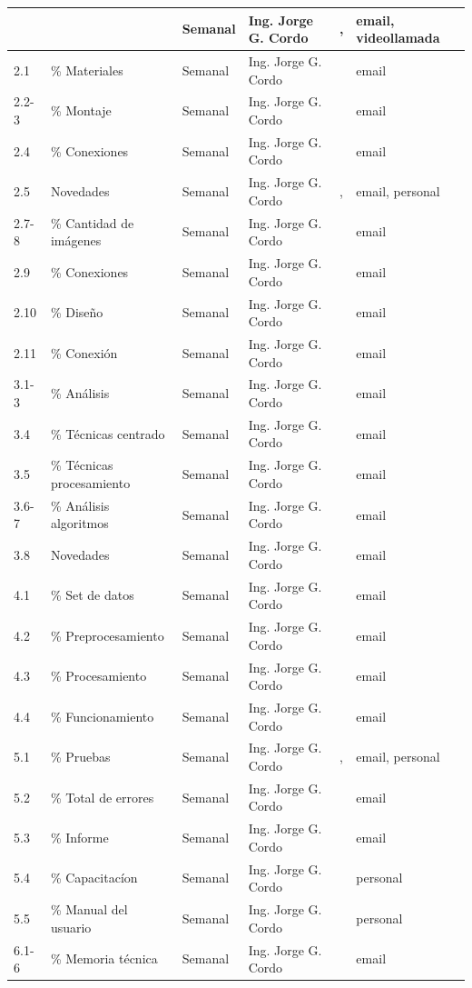 \documentclass[11pt]{charter}
\begin{document}
\begin{longtable}{|m{1cm}|m{3.5cm}|m{2.2cm}|m{2cm}|m{3cm}|m{1.5cm}|}
\endlastfoot
1	 	& \fechaInicioName  		&Semanal  	&Ing. Jorge G. Cordo 	&\supname, \clientename  	&email, videollamada \\ \hline
2.1	 	& \% Materiales				&Semanal 	&Ing. Jorge G. Cordo 	&\supname 					&email \\ \hline
2.2-3	& \% Montaje				&Semanal 	&Ing. Jorge G. Cordo 	&\supname 					&email \\ \hline
2.4	 	& \% Conexiones				&Semanal 	&Ing. Jorge G. Cordo 	&\supname 					&email \\ \hline
2.5	 	& Novedades					&Semanal 	&Ing. Jorge G. Cordo 	&\supname, \clientename		&email,  personal \\ \hline
2.7-8 	& \% Cantidad de imágenes	&Semanal 	&Ing. Jorge G. Cordo	&\supname 					&email \\ \hline
2.9	 	& \% Conexiones				&Semanal 	&Ing. Jorge G. Cordo	&\supname 					&email \\ \hline
2.10 	& \% Diseño					&Semanal 	&Ing. Jorge G. Cordo	&\supname 					&email \\ \hline
2.11 	& \% Conexión				&Semanal 	&Ing. Jorge G. Cordo 	&\supname 					&email \\ \hline
3.1-3  	& \% Análisis				&Semanal 	&Ing. Jorge G. Cordo 	&\supname 					&email \\ \hline
3.4  	& \% Técnicas centrado		&Semanal 	&Ing. Jorge G. Cordo 	&\supname 					&email \\ \hline
3.5  	& \% Técnicas procesamiento	&Semanal 	&Ing. Jorge G. Cordo 	&\supname 					&email \\ \hline
3.6-7  	& \% Análisis algoritmos	&Semanal 	&Ing. Jorge G. Cordo	&\supname 					&email \\ \hline
3.8  	& Novedades					&Semanal 	&Ing. Jorge G. Cordo	&\supname 					&email \\ \hline
4.1  	& \% Set de datos			&Semanal 	&Ing. Jorge G. Cordo 	&\supname 					&email \\ \hline
4.2  	& \% Preprocesamiento 		&Semanal 	&Ing. Jorge G. Cordo 	&\supname 					&email \\ \hline
4.3  	& \% Procesamiento			&Semanal 	&Ing. Jorge G. Cordo	&\supname 					&email \\ \hline
4.4  	& \% Funcionamiento			&Semanal 	&Ing. Jorge G. Cordo 	&\supname 					&email \\ \hline
5.1  	& \% Pruebas				&Semanal 	&Ing. Jorge G. Cordo 	&\supname, \clientename		&email,  personal \\ \hline
5.2  	& \% Total de errores		&Semanal 	&Ing. Jorge G. Cordo 	&\supname					&email \\ \hline
5.3  	& \% Informe				&Semanal 	&Ing. Jorge G. Cordo 	&\supname 					&email \\ \hline
5.4  	& \% Capacitacíon			&Semanal 	&Ing. Jorge G. Cordo 	&\clientename				&personal \\ \hline
5.5  	& \% Manual del usuario		&Semanal 	&Ing. Jorge G. Cordo 	&\clientename 				&personal \\ \hline
6.1-6  	& \% Memoria técnica		&Semanal 	&Ing. Jorge G. Cordo 	&\supname 					& email \\ \hline



\end{longtable}
\end{document}
